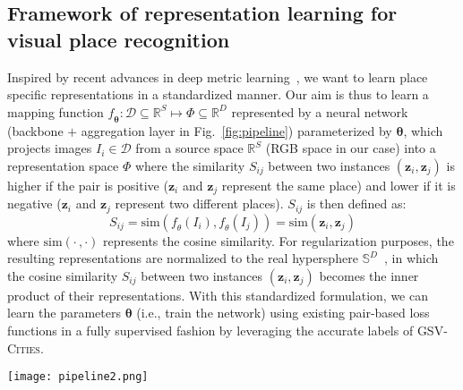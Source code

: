 \documentclass{article}
\begin{document}
\subsection{Framework of representation learning for visual place recognition}\label{sec:framework}
Inspired by recent advances in deep metric learning~\cite{wang2019multi}, we want to learn place specific representations in a standardized manner.
Our aim is thus to learn a mapping function $\mathit{f_{\mathbf{\theta}}} : \mathcal{D} \subseteq \mathbb{R}^{S} \mapsto \Phi \subseteq \mathbb{R}^{D}$ represented by a neural network (backbone $+$ aggregation layer in Fig.~\ref{fig:pipeline}) parameterized by $\mathbf{\theta}$, which projects images $I_i \in \mathcal{D}$ from a source space $\mathbb{R}^{S}$ (RGB space in our case) into a representation space $\Phi$ where the similarity $S_{ij}$ between two instances $\left(\mathbf{z}_i, \mathbf{z}_j\right)$ is higher if the pair is positive ($\mathbf{z}_i$ and $\textbf{z}_j$ represent the same place) and lower if it is negative ($\mathbf{z}_i$ and $\mathbf{z}_j$ represent two different places). $S_{ij}$ is then defined as:
\begin{equation}
    S_{ij} = \text{sim}\left(\mathit{f_{\theta}}\left(I_i\right), \mathit{f_{\theta}}\left(I_j\right)\right) = \text{sim}\left(\textbf{z}_i, \textbf{z}_j\right)
\end{equation}
where $\text{sim}\left(\cdot\, , \cdot\right)$ represents the cosine similarity. For regularization purposes, the resulting representations are normalized to the real hypersphere $\mathbb{S}^{D}$~\cite{wu2017sampling}, in which the cosine similarity $S_{ij}$ between two instances $\left(\mathbf{z}_i, \mathbf{z}_j\right)$ becomes the inner product of their representations.
With this standardized formulation, we can learn the parameters $\mathbf{\theta}$ (i.e., train the network) using existing pair-based loss functions in a fully supervised fashion by leveraging the accurate labels of \textsc{GSV-Cities}. 


\begin{figure*}[t]
\centering
\texttt{[image: pipeline2.png]}
\caption{Framework of representation learning for visual place recognition. Our dataset, \textsc{GSV-Cities}, makes it straightforward to construct batches comprised of $P$ places each of which depicted by $K$ images. The neural network (backbone + aggregation layer) computes a representation ($\mathbf{z}_i$) for each image in the batch. The matrix $\mathbf{S}$ comprises pairwise similarity between all instances in the batch, which are used to mine informative pairs (or triplets as in this example) in an online fashion. The loss function operates on these pairs/triplets to minimize an objective that maximizes the similarity between instances of the same place and minimizes that of different places.}
\label{fig:pipeline}
\end{figure*}
\end{document}
